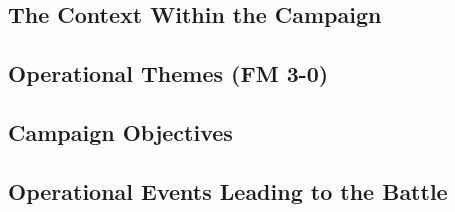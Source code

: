 \subsection{The Context Within the Campaign}

\subsection{Operational Themes (FM 3-0)}

\subsection{Campaign Objectives}

\subsection{Operational Events Leading to the Battle}




